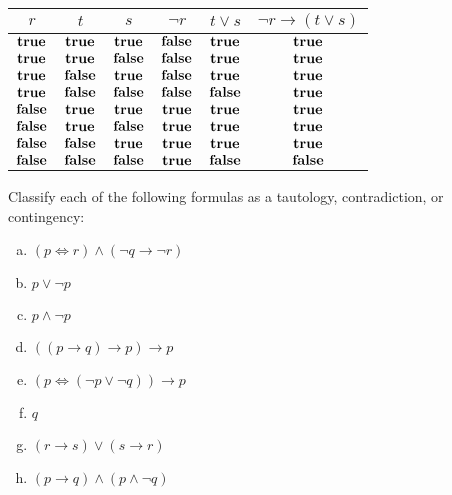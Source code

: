 \documentclass{article}
\begin{document}
\begin{center}
\begin{tabular}{c|c|c||c|c|c}
    $r$ & $t$ & $s$ & $\neg r$ & $t \vee s$ & $\neg r \to (t \vee s)$ \\
    \hline
    $\mathbf{true}$  & $\mathbf{true}$  & $\mathbf{true}$  & $\mathbf{false}$ & $\mathbf{true}$  & $\mathbf{true}$  \\
    $\mathbf{true}$  & $\mathbf{true}$  & $\mathbf{false}$ & $\mathbf{false}$ & $\mathbf{true}$  & $\mathbf{true}$  \\
    $\mathbf{true}$  & $\mathbf{false}$ & $\mathbf{true}$  & $\mathbf{false}$ & $\mathbf{true}$  & $\mathbf{true}$  \\
    $\mathbf{true}$  & $\mathbf{false}$ & $\mathbf{false}$ & $\mathbf{false}$ & $\mathbf{false}$ & $\mathbf{true}$  \\
    $\mathbf{false}$ & $\mathbf{true}$  & $\mathbf{true}$  & $\mathbf{true}$  & $\mathbf{true}$  & $\mathbf{true}$  \\
    $\mathbf{false}$ & $\mathbf{true}$  & $\mathbf{false}$ & $\mathbf{true}$  & $\mathbf{true}$  & $\mathbf{true}$  \\
    $\mathbf{false}$ & $\mathbf{false}$ & $\mathbf{true}$  & $\mathbf{true}$  & $\mathbf{true}$  & $\mathbf{true}$  \\
    $\mathbf{false}$ & $\mathbf{false}$ & $\mathbf{false}$ & $\mathbf{true}$  & $\mathbf{false}$ & $\mathbf{false}$ \\
\end{tabular}
\end{center}

\begin{prob}{3.2}
    Classify each of the following formulas as a tautology, contradiction, or contingency:
    \begin{multicols}{2}
    \begin{enumerate}[a)]
    \item $(p \iff r) \wedge (\neg q \to \neg r)$
    \item $p \vee \neg p$
    \item $p \wedge \neg p$
    \item $((p \to q) \to p) \to p$
    \item $(p \iff (\neg p \vee \neg q)) \to p$
    \item $q$
    \item $(r \to s) \vee (s \to r)$
    \item $(p \to q) \wedge (p \wedge \neg q)$
    \end{enumerate}
    \end{multicols}
\end{prob}
\end{document}
